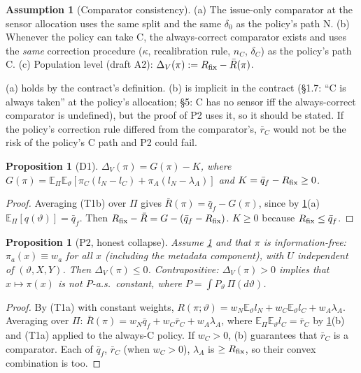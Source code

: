 \documentclass[11pt,a4paper]{article}
\newtheorem{proposition}[theorem]{Proposition}
\theoremstyle{definition}
\newtheorem{assumption}{Assumption}
\theoremstyle{remark}
\newcommand{\E}{\mathbb{E}}
\newcommand{\vt}{\vartheta}
\newcommand{\lA}{\lambda_A}
\begin{document}
\begin{assumption}[Comparator consistency]\label{S:comp}
(a) The issue-only comparator at the sensor allocation uses the same split and the same
$\delta_0$ as the policy's path N. (b) Whenever the policy can take C, the always-correct
comparator exists and uses the \emph{same} correction procedure ($\kappa$, recalibration
rule, $n_C$, $\delta_C$) as the policy's path C. (c) Population level (draft A2):
$\Delta_V(\pi):=R_{\rm fix}-\bar R(\pi)$.
\end{assumption}
(a) holds by the contract's definition. (b) is implicit in the contract (§1.7: ``C is
always taken'' at the policy's allocation; §5: C has no sensor iff the always-correct
comparator is undefined), but the proof of P2 uses it, so it should be stated. If the
policy's correction rule differed from the comparator's, $\bar r_C$ would not be the risk of
the policy's C path and P2 could fail.

\begin{proposition}[D1]
$\Delta_V(\pi)=G(\pi)-K$, where
$G(\pi)=\E_\Pi\E_\vt[\pi_C(l_N-l_C)+\pi_A(l_N-\lA)]$ and $K=\bar q_f-R_{\rm fix}\ge0$.
\end{proposition}
\begin{proof}
Averaging (T1b) over $\Pi$ gives $\bar R(\pi)=\bar q_f-G(\pi)$, since by
\ref{S:comp}(a) $\E_\Pi[q(\vt)]=\bar q_f$. Then $R_{\rm fix}-\bar R=G-(\bar q_f-R_{\rm fix})$.
$K\ge0$ because $R_{\rm fix}\le\bar q_f$.
\end{proof}

\begin{proposition}[P2, honest collapse]\label{prop:P2}
Assume \ref{S:comp} and that $\pi$ is information-free: $\pi_a(x)\equiv w_a$ for all $x$
(including the metadata component), with $U$ independent of $(\vt,X,Y)$. Then
$\Delta_V(\pi)\le0$. Contrapositive: $\Delta_V(\pi)>0$ implies that $x\mapsto\pi(x)$ is not
$P$-a.s.\ constant, where $P=\int P_\vt\,\Pi(d\vt)$.
\end{proposition}
\begin{proof}
By (T1a) with constant weights,
$R(\pi;\vt)=w_N\E_\vt l_N+w_C\E_\vt l_C+w_A\lA$. Averaging over $\Pi$:
$\bar R(\pi)=w_N\bar q_f+w_C\bar r_C+w_A\lA$, where $\E_\Pi\E_\vt l_C=\bar r_C$ by
\ref{S:comp}(b) and (T1a) applied to the always-C policy. If $w_C>0$, (b) guarantees that
$\bar r_C$ is a comparator. Each of $\bar q_f$, $\bar r_C$ (when $w_C>0$), $\lA$ is
$\ge R_{\rm fix}$, so their convex combination is too.
\end{proof}
\end{document}
